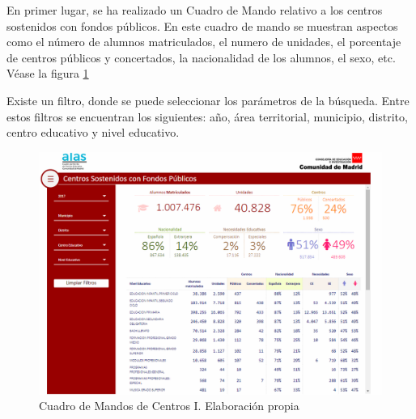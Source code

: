 En primer lugar, se ha realizado un Cuadro de Mando relativo a los centros sostenidos con fondos públicos. En este cuadro de mando se muestran aspectos como el número de alumnos matriculados, el numero de unidades, el porcentaje de centros públicos y concertados, la nacionalidad de los alumnos, el sexo, etc. Véase la figura \ref{fig:CentrosResumenI}

Existe un filtro, donde se puede seleccionar los parámetros de la búsqueda. Entre estos filtros se encuentran los siguientes: año, área territorial, municipio, distrito, centro educativo y nivel educativo.

\begin{figure}[htb]
	\centering
	\caption{Cuadro de Mandos de Centros I. Elaboración propia}
	\label{fig:CentrosResumenI}
	\includegraphics[width=1\textwidth]{recursos/CentrosResumenI}
\end{figure}


